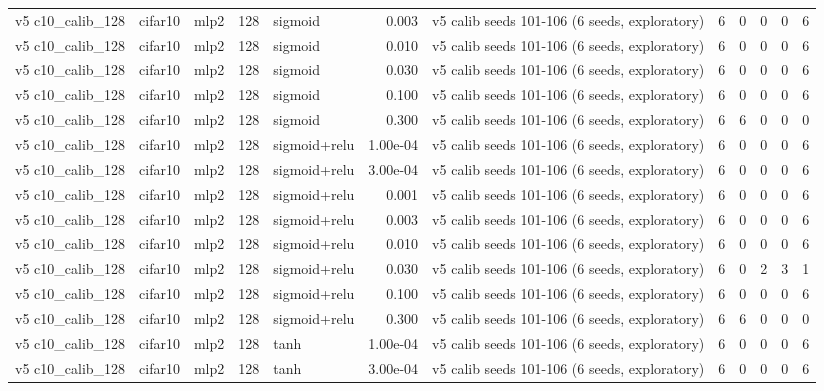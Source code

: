 \begin{table}[htbp]
{\begin{tabular}{@{}lllrlrlrrrrr@{}}
v5 c10\_calib\_128 & cifar10 & mlp2 & 128 & sigmoid & 0.003 & v5 calib seeds 101-106 (6 seeds, exploratory) & 6 & 0 & 0 & 0 & 6 \\
v5 c10\_calib\_128 & cifar10 & mlp2 & 128 & sigmoid & 0.010 & v5 calib seeds 101-106 (6 seeds, exploratory) & 6 & 0 & 0 & 0 & 6 \\
v5 c10\_calib\_128 & cifar10 & mlp2 & 128 & sigmoid & 0.030 & v5 calib seeds 101-106 (6 seeds, exploratory) & 6 & 0 & 0 & 0 & 6 \\
v5 c10\_calib\_128 & cifar10 & mlp2 & 128 & sigmoid & 0.100 & v5 calib seeds 101-106 (6 seeds, exploratory) & 6 & 0 & 0 & 0 & 6 \\
v5 c10\_calib\_128 & cifar10 & mlp2 & 128 & sigmoid & 0.300 & v5 calib seeds 101-106 (6 seeds, exploratory) & 6 & 6 & 0 & 0 & 0 \\
v5 c10\_calib\_128 & cifar10 & mlp2 & 128 & sigmoid+relu & 1.00e-04 & v5 calib seeds 101-106 (6 seeds, exploratory) & 6 & 0 & 0 & 0 & 6 \\
v5 c10\_calib\_128 & cifar10 & mlp2 & 128 & sigmoid+relu & 3.00e-04 & v5 calib seeds 101-106 (6 seeds, exploratory) & 6 & 0 & 0 & 0 & 6 \\
v5 c10\_calib\_128 & cifar10 & mlp2 & 128 & sigmoid+relu & 0.001 & v5 calib seeds 101-106 (6 seeds, exploratory) & 6 & 0 & 0 & 0 & 6 \\
v5 c10\_calib\_128 & cifar10 & mlp2 & 128 & sigmoid+relu & 0.003 & v5 calib seeds 101-106 (6 seeds, exploratory) & 6 & 0 & 0 & 0 & 6 \\
v5 c10\_calib\_128 & cifar10 & mlp2 & 128 & sigmoid+relu & 0.010 & v5 calib seeds 101-106 (6 seeds, exploratory) & 6 & 0 & 0 & 0 & 6 \\
v5 c10\_calib\_128 & cifar10 & mlp2 & 128 & sigmoid+relu & 0.030 & v5 calib seeds 101-106 (6 seeds, exploratory) & 6 & 0 & 2 & 3 & 1 \\
v5 c10\_calib\_128 & cifar10 & mlp2 & 128 & sigmoid+relu & 0.100 & v5 calib seeds 101-106 (6 seeds, exploratory) & 6 & 0 & 0 & 0 & 6 \\
v5 c10\_calib\_128 & cifar10 & mlp2 & 128 & sigmoid+relu & 0.300 & v5 calib seeds 101-106 (6 seeds, exploratory) & 6 & 6 & 0 & 0 & 0 \\
v5 c10\_calib\_128 & cifar10 & mlp2 & 128 & tanh & 1.00e-04 & v5 calib seeds 101-106 (6 seeds, exploratory) & 6 & 0 & 0 & 0 & 6 \\
v5 c10\_calib\_128 & cifar10 & mlp2 & 128 & tanh & 3.00e-04 & v5 calib seeds 101-106 (6 seeds, exploratory) & 6 & 0 & 0 & 0 & 6 \\

\end{tabular}}
\end{table}
